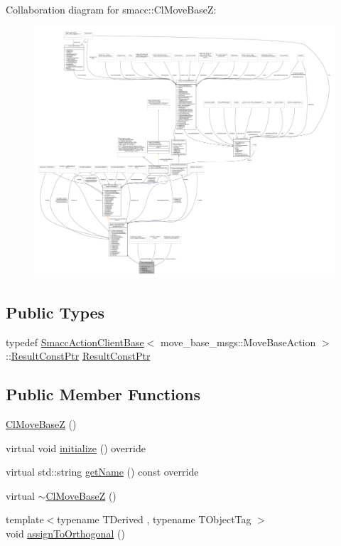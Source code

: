 Collaboration diagram for smacc\+:\+:Cl\+Move\+BaseZ\+:
\nopagebreak
\begin{figure}[H]
\begin{center}
\leavevmode
\includegraphics[width=350pt]{classsmacc_1_1ClMoveBaseZ__coll__graph}
\end{center}
\end{figure}
\subsection*{Public Types}
\begin{DoxyCompactItemize}
\item 
typedef \hyperlink{classsmacc_1_1SmaccActionClientBase}{Smacc\+Action\+Client\+Base}$<$ move\+\_\+base\+\_\+msgs\+::\+Move\+Base\+Action $>$\+::\hyperlink{classsmacc_1_1ClMoveBaseZ_a0389d198a678c4561d7ac7abca76f143}{Result\+Const\+Ptr} \hyperlink{classsmacc_1_1ClMoveBaseZ_a0389d198a678c4561d7ac7abca76f143}{Result\+Const\+Ptr}
\end{DoxyCompactItemize}
\subsection*{Public Member Functions}
\begin{DoxyCompactItemize}
\item 
\hyperlink{classsmacc_1_1ClMoveBaseZ_ab8c94cd18bdd7ca437d5ad37483271b4}{Cl\+Move\+BaseZ} ()
\item 
virtual void \hyperlink{classsmacc_1_1ClMoveBaseZ_a0eb8e4a0e80456fa534bbef7b2e330a5}{initialize} () override
\item 
virtual std\+::string \hyperlink{classsmacc_1_1ClMoveBaseZ_aa0292ad4bf6ddd4591d239c71ae0d06a}{get\+Name} () const override
\item 
virtual \hyperlink{classsmacc_1_1ClMoveBaseZ_a74912dd617e43a30376c9c94ab522ca0}{$\sim$\+Cl\+Move\+BaseZ} ()
\item 
{\footnotesize template$<$typename T\+Derived , typename T\+Object\+Tag $>$ }\\void \hyperlink{classsmacc_1_1ClMoveBaseZ_a35b43d1746802c1180baf14b27f7302a}{assign\+To\+Orthogonal} ()
\end{DoxyCompactItemize}
